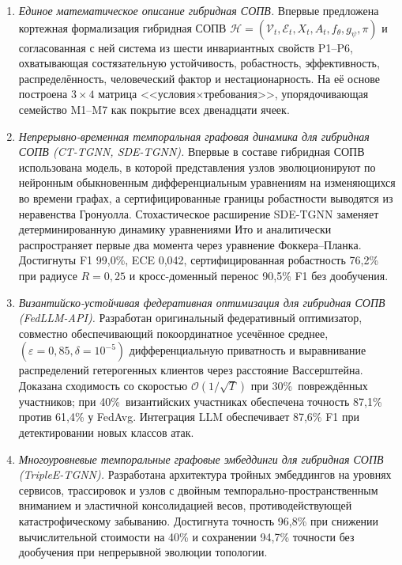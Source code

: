\documentclass[12pt,a5paper]{article}
\begin{document}
\begin{enumerate}
\item \textit{Единое математическое описание гибридная СОПВ.}
Впервые предложена кортежная формализация гибридная СОПВ
$\mathcal{H} = (\mathcal{V}_t, \mathcal{E}_t, X_t, A_t, f_\theta,
g_\psi, \pi)$ и согласованная с ней система из шести
инвариантных свойств P1--P6, охватывающая состязательную
устойчивость, робастность, эффективность, распределённость,
человеческий фактор и нестационарность. На её основе построена
$3\times4$ матрица <<условия$\times$требования>>, упорядочивающая
семейство M1--M7 как покрытие всех двенадцати ячеек.

\item \textit{Непрерывно-временная темпоральная графовая
динамика для гибридная СОПВ (CT-TGNN, SDE-TGNN).} Впервые в составе
гибридная СОПВ использована модель, в которой представления узлов
эволюционируют по нейронным обыкновенным дифференциальным
уравнениям на изменяющихся во времени графах, а сертифицированные
границы робастности выводятся из неравенства Гронуолла. Стохастическое
расширение SDE-TGNN заменяет детерминированную динамику
уравнениями Ито и аналитически распространяет первые два
момента через уравнение Фоккера--Планка. Достигнуты F1
99,0\%, ECE 0,042, сертифицированная робастность 76,2\% при
радиусе $R{=}0{,}25$ и кросс-доменный перенос 90,5\% F1 без
дообучения.

\item \textit{Византийско-устойчивая федеративная оптимизация
для гибридная СОПВ (FedLLM-API).} Разработан оригинальный
федеративный оптимизатор, совместно обеспечивающий покоординатное
усечённое среднее, $(\varepsilon{=}0{,}85,\delta{=}10^{-5})$
дифференциальную приватность и выравнивание распределений
гетерогенных клиентов через расстояние Вассерштейна. Доказана
сходимость со скоростью $\mathcal{O}(1/\sqrt{T})$ при
30\%~повреждённых участников; при 40\%~византийских участниках
обеспечена точность 87,1\% против 61,4\% у FedAvg. Интеграция
LLM обеспечивает 87,6\% F1 при детектировании новых классов
атак.

\item \textit{Многоуровневые темпоральные графовые эмбеддинги
для гибридная СОПВ (TripleE-TGNN).} Разработана архитектура
тройных эмбеддингов на уровнях сервисов, трассировок и узлов
с двойным темпорально-пространственным вниманием и эластичной
консолидацией весов, противодействующей катастрофическому
забыванию. Достигнута точность 96,8\% при снижении
вычислительной стоимости на 40\% и сохранении 94,7\% точности
без дообучения при непрерывной эволюции топологии.


\end{enumerate}
\end{document}
